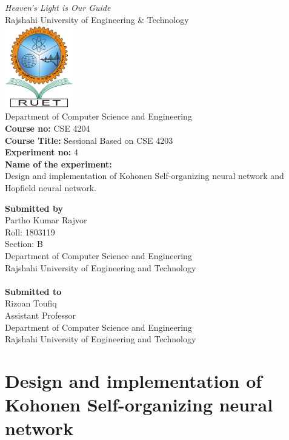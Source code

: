 \begin{center}
    \textit{Heaven’s Light is Our Guide} \\
    \vspace{1cm}
    \Large{Rajshahi University of Engineering \& Technology} \\
    \vspace{1cm}
    \includegraphics[width=3cm]{ruet-logo.png}\\
    \vspace{0.1cm}
    \Large{Department of Computer Science and Engineering} \\
    \vspace{1cm}
    \large{\textbf{Course no:} CSE 4204} \\
    \large{\textbf{Course Title:} Sessional Based on CSE 4203} \\
    \large{\textbf{Experiment no:} 4}\\
    \large{\textbf{Name of the experiment:}} \\
    \large{Design and implementation of Kohonen Self-organizing neural network and Hopfield neural network.} \\
    \vspace{1cm}
\end{center}
\thispagestyle{empty}
\Large{\textbf{Submitted by}}\\
Partho Kumar Rajvor \\
Roll: 1803119 \\
Section: B \\
Department of Computer Science and Engineering\\
Rajshahi University of Engineering and Technology\\\\
\Large{\textbf{Submitted to}}\\
Rizoan Toufiq \\
Assistant Professor \\
Department of Computer Science and Engineering \\
Rajshahi University of Engineering and Technology
\tableofcontents

\setcounter{chapter}{2}
\chapter{Design and implementation of Kohonen Self-organizing neural network}
